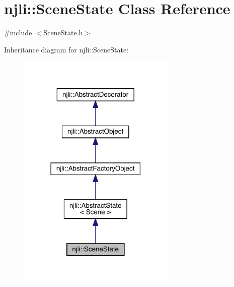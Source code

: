 \hypertarget{classnjli_1_1_scene_state}{}\section{njli\+:\+:Scene\+State Class Reference}
\label{classnjli_1_1_scene_state}


{\ttfamily \#include $<$Scene\+State.\+h$>$}



Inheritance diagram for njli\+:\+:Scene\+State\+:\nopagebreak
\begin{figure}[H]
\begin{center}
\leavevmode
\includegraphics[width=213pt]{classnjli_1_1_scene_state__inherit__graph}
\end{center}
\end{figure}


